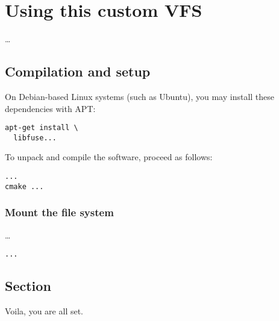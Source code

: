 \chapter{Using this custom VFS}

\ldots

\section*{Compilation and setup}

On Debian-based Linux systems (such as Ubuntu), you may install these dependencies with APT:

\begin{Verbatim}
apt-get install \
  libfuse...
\end{Verbatim}

To unpack and compile the software, proceed as follows:

\begin{Verbatim}
...
cmake ...
\end{Verbatim}

\subsection*{Mount the file system}

\ldots

\begin{Verbatim}
...
\end{Verbatim}

\section*{Section}

Voila, you are all set.